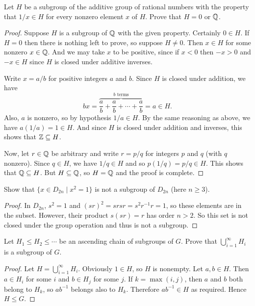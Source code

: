  Let $H$ be a subgroup of the additive group of rational
numbers with the property that $1/x\in H$ for every nonzero element
$x$ of $H$. Prove that $H = 0$ or $\mathbb{Q}$.
\begin{proof}
  Suppose $H$ is a subgroup of $\mathbb{Q}$ with the given property. Certainly
  $0\in H$. If $H = 0$ then there is nothing left to prove, so suppose
  $H\neq0$. Then $x\in H$ for some nonzero $x\in\mathbb{Q}$. And we may take
  $x$ to be positive, since if $x < 0$ then $-x > 0$ and $-x\in H$
  since $H$ is closed under additive inverses.

  Write $x = a/b$ for positive integers $a$ and $b$. Since $H$ is
  closed under addition, we have
  \begin{equation*}
    bx = \overbrace{\frac{a}b + \frac{a}b
      + \cdots + \frac{a}b}^{\text{$b$ terms}} = a\in H.
  \end{equation*}
  Also, $a$ is nonzero, so by hypothesis $1/a\in H$. By the same
  reasoning as above, we have $a(1/a) = 1\in H$. And since $H$ is
  closed under addition and inverses, this shows that $\mathbb{Z}\subseteq H$.

  Now, let $r\in\mathbb{Q}$ be arbitrary and write $r = p/q$ for integers $p$
  and $q$ (with $q$ nonzero). Since $q\in H$, we have $1/q\in H$ and
  so $p(1/q) = p/q\in H$. This shows that $\mathbb{Q}\subseteq H$. But
  $H\subseteq\mathbb{Q}$, so $H = \mathbb{Q}$ and the proof is complete.
\end{proof}

 Show that $\{x\in D_{2n} \mid x^2 = 1\}$ is not a
subgroup of $D_{2n}$ (here $n\geq3$).
\begin{proof}
  In $D_{2n}$, $s^2 = 1$ and $(sr)^2 = srsr = s^2r^{-1}r = 1$, so
  these elements are in the subset. However, their product $s(sr) = r$
  has order $n>2$. So this set is not closed under the group operation
  and thus is not a subgroup.
\end{proof}

 Let $H_1\leq H_2\leq\cdots$ be an ascending chain of
subgroups of $G$. Prove that $\bigcup_{i=1}^\infty H_i$ is a subgroup
of $G$.
\begin{proof}
  Let $H = \bigcup_{i=1}^\infty H_i$. Obviously $1\in H$, so $H$ is
  nonempty. Let $a,b\in H$. Then $a\in H_i$ for some $i$ and
  $b\in H_j$ for some $j$. If $k = \max(i,j)$, then $a$ and $b$ both
  belong to $H_k$, so $ab^{-1}$ belongs also to $H_k$. Therefore
  $ab^{-1}\in H$ as required. Hence $H\leq G$.
\end{proof}

